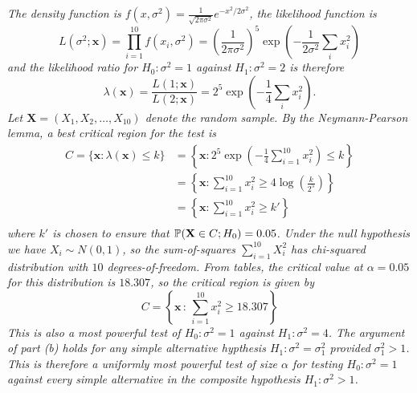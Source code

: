 \begin{exercise}
\begin{questions}
\begin{answer}
\ben
\it %
The density function is $f(x,\sigma^2) = \displaystyle\frac{1}{\sqrt{2\pi\sigma^2}}e^{-x^2/2\sigma^2}$, the likelihood function is 
\[
L(\sigma^2;\mathbf{x}) 
	= \prod_{i=1}^{10} f(x_i,\sigma^2)
	= \left(\frac{1}{2\pi\sigma^2}\right)^{5}\exp\left(-\frac{1}{2\sigma^2}\sum_i x_i^2\right)
\]
and the likelihood ratio for $H_0:\sigma^2=1$ against $H_1:\sigma^2=2$ is therefore
\[
\lambda(\mathbf{x})
	= \frac{L(1;\mathbf{x})}{L(2;\mathbf{x})}
	= 2^{5} \exp\left(-\frac{1}{4}\sum_i x_i^2\right).
\]
Let $\mathbf{X}=(X_1,X_2,\ldots,X_{10})$ denote the random sample. By the Neymann-Pearson lemma, a best critical region for the test is
\begin{align*}
C 	= \{\mathbf{x}:\lambda(\mathbf{x})\leq k\} 
	& = \left\{\mathbf{x}:2^{5} \exp\left(-\frac{1}{4}\sum_{i=1}^{10} x_i^2\right) \leq k\right\} \\
	& = \left\{\mathbf{x}:\sum_{i=1}^{10} x_i^2 \geq 4\log\left(\frac{k}{2^{5}}\right)\right\} \\
	& = \left\{\mathbf{x}:\sum_{i=1}^{10} x_i^2 \geq k'\right\} \\
\end{align*}
where $k'$ is chosen to ensure that $\mathbb{P}(\mathbf{X}\in C;H_0)=0.05$. 
\it %
Under the null hypothesis we have $X_i\sim N(0,1)$, so the sum-of-squares $\sum_{i=1}^{10} X_i^2$ has chi-squared distribution with $10$ degrees-of-freedom. From tables, the critical value at $\alpha=0.05$ for this distribution is $18.307$, so the critical region is given by 
\[
C = \left\{\mathbf{x}\,:\,\sum_{i=1}^{10} x_i^2 \geq 18.307\right\} 
\]
This is also a most powerful test of $H_0:\sigma^2=1$ against $H_1:\sigma^2=4$. 
\it
The argument of part (b) holds for any simple alternative hypthesis $H_1:\sigma^2=\sigma^2_1$ provided $\sigma^2_1 > 1$. This is therefore a \emph{uniformly most powerful test} of size $\alpha$ for testing $H_0:\sigma^2=1$ against every simple alternative in the composite hypothesis $H_1:\sigma^2>1$.
\een
\end{answer}


\end{questions}
\end{exercise}
